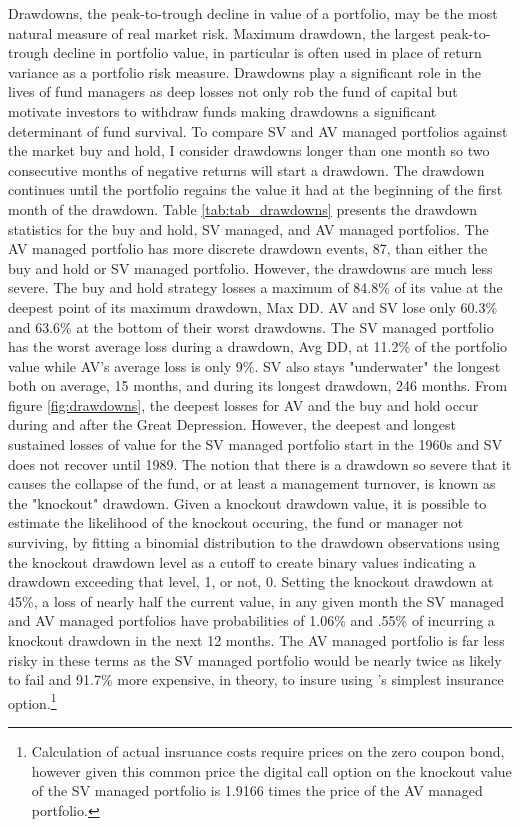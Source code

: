 Drawdowns, the peak-to-trough decline in value of a portfolio, may be the most natural measure of real market risk. \citep{magdon-ismail_maximum_2006} Maximum drawdown, the largest peak-to-trough decline in portfolio value, in particular is often used in place of return variance as a portfolio risk measure. \citep{johansen_large_2000,articlev1,articlev2,noauthor_sornette_nodate} Drawdowns play a significant role in the lives of fund managers as deep losses not only rob the fund of capital but motivate investors to withdraw funds making drawdowns a significant determinant of fund survival. \citep{baba_hedge_nodate,papaioannou_procyclical_2013,lang_2006} To compare SV and AV managed portfolios against the market buy and hold, I consider drawdowns longer than one month so two consecutive months of negative returns will start a drawdown. The drawdown continues until the portfolio regains the value it had at the beginning of the first month of the drawdown. Table \ref{tab:tab_drawdowns} presents the drawdown statistics for the buy and hold, SV managed, and AV managed portfolios. The AV managed portfolio has more discrete drawdown events, 87, than either the buy and hold or SV managed portfolio. However, the drawdowns are much less severe. The buy and hold strategy losses a maximum of 84.8\% of its value at the deepest point of its maximum drawdown, Max DD. AV and SV lose only 60.3\% and 63.6\% at the bottom of their worst drawdowns. The SV managed portfolio has the worst average loss during a drawdown, Avg DD, at 11.2\% of the portfolio value while AV's average loss is only 9\%. SV also stays "underwater" the longest both on average, 15 months, and during its longest drawdown, 246 months. From figure \ref{fig:drawdowns}, the deepest losses for AV and the buy and hold occur during and after the Great Depression. However, the deepest and longest sustained losses of value for the SV managed portfolio start in the 1960s and SV does not recover until 1989. The notion that there is a drawdown so severe that it causes the collapse of the fund, or at least a management turnover, is known as the "knockout" drawdown. Given a knockout drawdown value, it is possible to estimate the likelihood of the knockout occuring, the fund or manager not surviving, by fitting a binomial distribution to the drawdown observations using the knockout drawdown level as a cutoff to create binary values indicating a drawdown exceeding that level, 1, or not, 0. \citep{pav_notes_nodate} Setting the knockout drawdown at 45\%, a loss of nearly half the current value, in any given month the SV managed and AV managed portfolios have probabilities of 1.06\% and .55\% of incurring a knockout drawdown in the next 12 months. The AV managed portfolio is far less risky in these terms as the SV managed portfolio would be nearly twice as likely to fail and 91.7\% more expensive, in theory, to insure using \citet{carr_maximum_2011}'s simplest insurance option.\footnote{Calculation of actual insruance costs require prices on the zero coupon bond, however given this common price the digital call option on the knockout value of the SV managed portfolio is 1.9166 times the price of the AV managed portfolio.}

